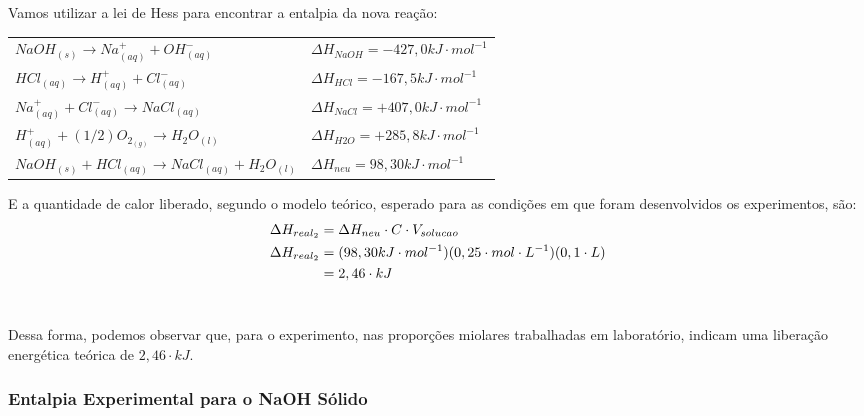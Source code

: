            \indent Vamos utilizar a lei de Hess para encontrar a entalpia da nova reação:\

            \begin{table}[h]
            	\centering
            	\renewcommand{\arraystretch}{2}
                \begin{tabular}{ll}
        			$NaOH_{(s)} \rightarrow Na^{+}_{(aq)} + OH^{-}_{(aq)}$ & $\Delta H_{NaOH} = -427,0 kJ \cdot mol^{-1}$ \\
                    $HCl_{(aq)} \rightarrow H^{+}_{(aq)} + Cl^{-}_{(aq)}$ & $\Delta H_{HCl} = -167,5 kJ \cdot mol^{-1}$ \\
                    $Na^{+}_{(aq)} + Cl^{-}_{(aq)} \rightarrow NaCl_{(aq)}$ & $\Delta H_{NaCl} = +407,0 kJ \cdot mol^{-1}$ \\
                    $H^{+}_{(aq)} + (1/2) O_{2}_{(g)} \rightarrow H_{2}O_{(l)}$  & $\Delta H_{H2O} = +285,8 kJ \cdot mol^{-1}$\\
                    \hline
                    $NaOH_{(s)} + HCl_{(aq)} \rightarrow NaCl_{(aq)} + H_{2}O_{(l)}$ & $\Delta H_{neu} =  98,30 kJ \cdot mol^{-1}$
				\end{tabular}\label{tab:table4}
            \end{table}         	
        
        	\indent E a quantidade de calor liberado, segundo o modelo teórico, esperado para as condições em que foram desenvolvidos os experimentos, são:\\
        	\begin{equation}
        		\begin{split}
        			\notag
        			\Delta{H_{real_2}} &= \Delta{H_{neu}} \cdot C \cdot V_{solucao}\\
        			\Delta{H_{real_2}} &=(98,30 kJ \cdot mol^{-1}) (0,25 \cdot mol \cdot L^{-1})(0,1 \cdot L) \\
        			&= 2,46 \cdot kJ\\
        		\end{split}
        	\end{equation}\
        	
        	\indent Dessa forma, podemos observar que, para o experimento, nas proporções miolares trabalhadas em laboratório, indicam uma liberação energética teórica de $2,46 \cdot kJ$.\
        	
        	\subsubsection{Entalpia Experimental para o NaOH Sólido}
        	
